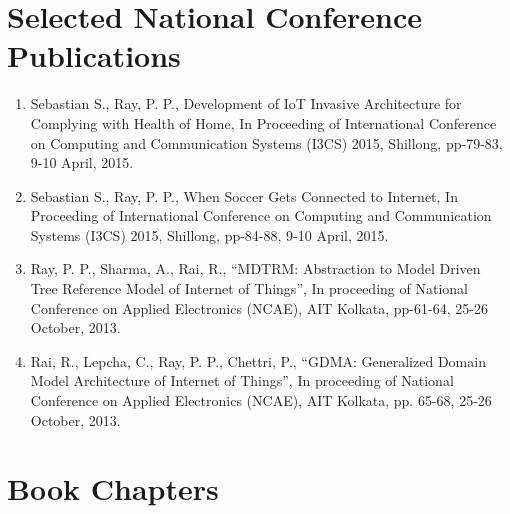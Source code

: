 \documentclass[11pt,a4paper]{moderncv}
\begin{document}
\section{\textbf{Selected National Conference Publications}}

\begin{adjustwidth}{6em}{0pt}
	\begin{enumerate}
		
		\item Sebastian S., Ray, P. P., Development of IoT Invasive Architecture for Complying with Health of Home, In Proceeding of International Conference on Computing and Communication Systems (I3CS) 2015, Shillong, pp-79-83, 9-10 April, 2015.
		
		\item Sebastian S., Ray, P. P., When Soccer Gets Connected to Internet, In Proceeding of International Conference on Computing and Communication Systems (I3CS) 2015, Shillong, pp-84-88, 9-10 April, 2015.
		
		\item Ray, P. P., Sharma, A., Rai, R., “MDTRM: Abstraction to Model Driven Tree Reference Model of Internet of Things”, In proceeding of National Conference on Applied Electronics (NCAE), AIT Kolkata, pp-61-64, 25-26 October, 2013.
		
		\item Rai, R., Lepcha, C., Ray, P. P., Chettri, P., “GDMA: Generalized Domain Model Architecture of Internet of Things”, In proceeding of National Conference on Applied Electronics (NCAE), AIT Kolkata, pp. 65-68, 25-26 October, 2013.
		
	
	\end{enumerate}
\end{adjustwidth}


\section{\textbf{Book Chapters}}
\end{document}
